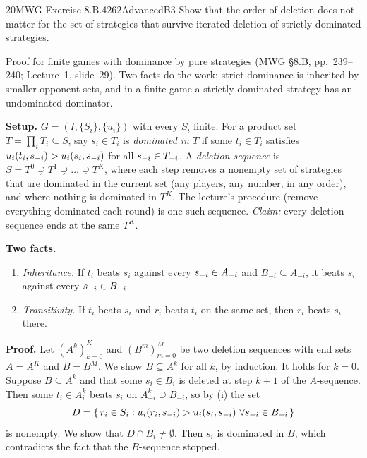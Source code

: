 \begin{exsol}{20}{MWG Exercise 8.B.4}{262}{Advanced}{B3}
\asked Show that the order of deletion does not matter for the set of strategies that survive
iterated deletion of strictly dominated strategies.

\method Proof for finite games with dominance by pure strategies (MWG \S8.B, pp.~239--240;
Lecture~1, slide~29). Two facts do the work: strict dominance is inherited by smaller opponent
sets, and in a finite game a strictly dominated strategy has an undominated dominator.

\solution
\textbf{Setup.} $G = (I, \{S_i\}, \{u_i\})$ with every $S_i$ finite. For a product set
$T = \prod_i T_i \subseteq S$, say $s_i \in T_i$ is \emph{dominated in $T$} if some $t_i \in T_i$
satisfies $u_i(t_i, s_{-i}) > u_i(s_i, s_{-i})$ for all $s_{-i} \in T_{-i}$. A \emph{deletion sequence} is
$S = T^0 \supsetneq T^1 \supsetneq \dots \supsetneq T^K$, where each step removes a nonempty set
of strategies that are dominated in the current set (any players, any number, in any order), and
where nothing is dominated in $T^K$. The lecture's procedure (remove everything dominated each
round) is one such sequence. \emph{Claim:} every deletion sequence ends at the same $T^K$.

\textbf{Two facts.}
\begin{enumerate}[label=(\roman*)]
  \item \emph{Inheritance.} If $t_i$ beats $s_i$ against every $s_{-i} \in A_{-i}$ and
  $B_{-i} \subseteq A_{-i}$, it beats $s_i$ against every $s_{-i} \in B_{-i}$.
  \item \emph{Transitivity.} If $t_i$ beats $s_i$ and $r_i$ beats $t_i$ on the same set, then
  $r_i$ beats $s_i$ there.
\end{enumerate}

\textbf{Proof.} Let $(A^k)_{k=0}^{K}$ and $(B^m)_{m=0}^{M}$ be two deletion sequences with end
sets $A = A^K$ and $B = B^M$. We show $B \subseteq A^k$ for all $k$, by induction. It holds for
$k=0$. Suppose $B \subseteq A^k$ and that some $s_i \in B_i$ is deleted at step $k+1$ of the
$A$-sequence. Then some $t_i \in A_i^k$ beats $s_i$ on $A_{-i}^k \supseteq B_{-i}$, so by (i)
the set
\[
  D = \{\, r_i \in S_i : u_i(r_i, s_{-i}) > u_i(s_i, s_{-i}) \ \forall s_{-i} \in B_{-i} \,\}
\]
is nonempty. We show that $D \cap B_i \neq \emptyset$. Then $s_i$ is dominated in $B$, which
contradicts the fact that the $B$-sequence stopped.


\end{exsol}
